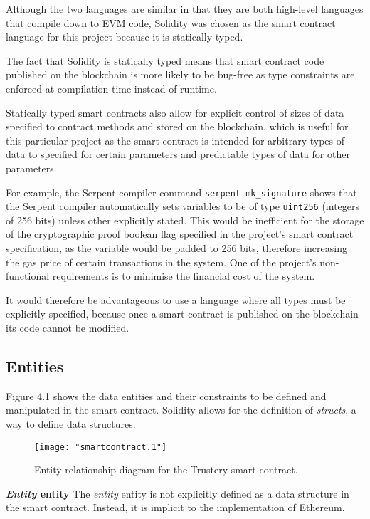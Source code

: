 \documentclass[12pt,a4paper]{report}
\newcommand{\code}{\texttt}
\begin{document}
	Although the two languages are similar in that they are both high-level languages that compile down to EVM code, Solidity was chosen as the smart contract language for this project because it is statically typed.
	
	The fact that Solidity is statically typed means that smart contract code published on the blockchain is more likely to be bug-free as type constraints are enforced at compilation time instead of runtime.
	
	Statically typed smart contracts also allow for explicit control of sizes of data specified to contract methods and stored on the blockchain, which is useful for this particular project as the smart contract is intended for arbitrary types of data to specified for certain parameters and predictable types of data for other parameters.
	
	For example, the Serpent compiler command \code{serpent mk\_signature} shows that the Serpent compiler automatically sets variables to be of type \code{uint256} (integers of 256 bits) unless other explicitly stated. This would be inefficient for the storage of the cryptographic proof boolean flag specified in the project's smart contract specification, as the variable would be padded to 256 bits\cite{14}, therefore increasing the gas price of certain transactions in the system. One of the project's non-functional requirements is to minimise the financial cost of the system.
	
	It would therefore be advantageous to use a language where all types must be explicitly specified, because once a smart contract is published on the blockchain its code cannot be modified.
	
	\subsection{Entities}
	Figure 4.1 shows the data entities and their constraints to be defined and manipulated in the smart contract. Solidity allows for the definition of \textit{structs}, a way to define data structures.\cite{13}
	\begin{figure}[!ht]
		\centering
			\texttt{[image: "smartcontract.1"]}
		\caption{Entity-relationship diagram for the Trustery smart contract.}
	\end{figure}
	
	\bigskip
	\noindent \textbf{\textit{Entity} entity}\newline
	The \textit{entity} entity is not explicitly defined as a data structure in the smart contract. Instead, it is implicit to the implementation of Ethereum.
	
\end{document}

